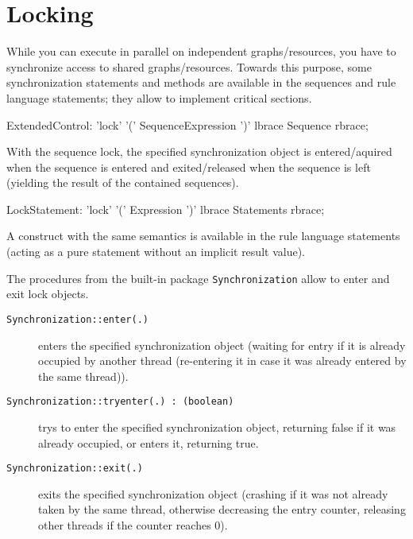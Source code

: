 \section{Locking}

While you can execute in parallel on independent graphs/resources, you have to synchronize access to shared graphs/resources.
Towards this purpose, some synchronization statements and methods are available in the sequences and rule language statements; they allow to implement critical sections.

\begin{rail}
  ExtendedControl: 'lock' '(' SequenceExpression ')' lbrace Sequence rbrace;
\end{rail}

With the sequence lock, the specified synchronization object is entered/aquired when the sequence is entered and exited/released when the sequence is left (yielding the result of the contained sequences).

\begin{rail}
  LockStatement: 'lock' '(' Expression ')' lbrace Statements rbrace;
\end{rail}

A construct with the same semantics is available in the rule language statements (acting as a pure statement without an implicit result value).

The procedures from the built-in package \texttt{Synchronization} allow to enter and exit lock objects.

\begin{description}
\item[\texttt{Synchronization::enter(.)}] enters the specified synchronization object (waiting for entry if it is already occupied by another thread (re-entering it in case it was already entered by the same thread)).
\item[\texttt{Synchronization::tryenter(.) : (boolean)}] trys to enter the specified synchronization object, returning false if it was already occupied, or enters it, returning true.
\item[\texttt{Synchronization::exit(.)}] exits the specified synchronization object (crashing if it was not already taken by the same thread, otherwise decreasing the entry counter, releasing other threads if the counter reaches 0).
\end{description}
   
